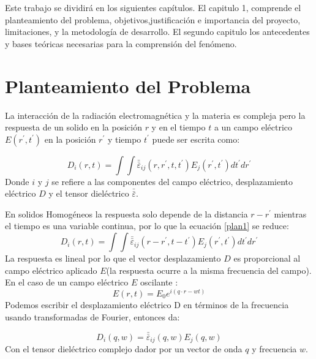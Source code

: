 \documentclass[a4paper,openright,12pt]{book}
\begin{document}
Este trabajo se dividirá en los siguientes capítulos. El capitulo 1, comprende el planteamiento del problema,  objetivos,justificación e importancia del proyecto, limitaciones, y la metodología de desarrollo. El segundo capitulo los antecedentes y bases teóricas  necesarias para la comprensión del fenómeno.  

\section{Planteamiento del Problema}

La interacción de la radiación electromagnética y la materia es compleja pero la respuesta de un solido en la posición $r$ y en el tiempo $t$ a un campo eléctrico $E(r^{'},t^{'})$ en la posición $r^{'}$ y tiempo $t^{'}$  puede ser escrita como:

\begin{equation}\label{plan1}
D_{i}(r,t)=\int\int \bar{\bar\varepsilon}_{ij}(r,r^{'},t,t^{'}) E_{j}(r^{'},t^{'})dt^{'}dr^{'}
\end{equation}
Donde $i$ y $j$ se refiere a las componentes del campo eléctrico, desplazamiento eléctrico $D$ y el tensor dieléctrico $\bar{\bar\varepsilon}$. 

En solidos Homogéneos la respuesta solo depende de la distancia $r-r^{'}$ mientras el tiempo es una variable continua, por lo que la ecuación \ref{plan1} se reduce:
\begin{equation}
D_{i}(r,t)=\int\int \bar{\bar\varepsilon}_{ij}(r-r^{'},t-t^{'})E_{j}(r^{'},t^{'})dt^{'}dr^{'}
\end{equation}
La respuesta es lineal por lo que el vector desplazamiento $D$ es proporcional al campo eléctrico aplicado $E$(la respuesta ocurre a la misma frecuencia del campo). En el caso de un campo eléctrico $E$ oscilante :  
\begin{equation}
E(r,t)=E_{0}e^{i(q\cdot r-wt)}
\end{equation}
Podemos escribir el desplazamiento eléctrico D en términos de la frecuencia usando transformadas de Fourier, entonces da:
 

\begin{equation}
D_{i}(q,w)=\bar{\bar\varepsilon}_{ij}(q,w)E_{j}(q,w)
\end{equation}
Con el tensor dieléctrico complejo dador por un vector de onda $q$ y frecuencia $w$. 
\end{document}
